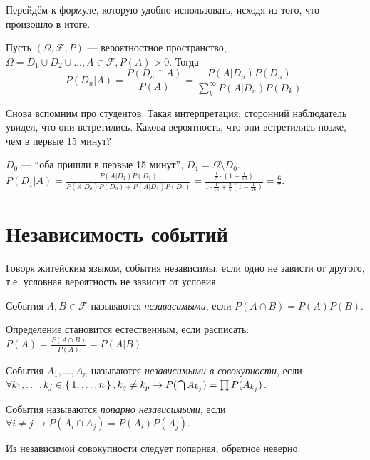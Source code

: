 Перейдём к формуле, которую удобно использовать, исходя из того, что произошло в итоге.

\begin{claim}
  Пусть $(\Omega, \mathcal{F}, P)$ --- вероятностное пространство, $\Omega = D_1 \cup D_2 \cup \ldots, A \in \mathcal{F}, P(A) > 0$. Тогда
  \[
	P(D_n|A) = \frac{P(D_n \cap A)}{P(A)} = \frac{P(A|D_n)P(D_n)}{\sum_k^{\infty} P(A|D_n)P(D_k)}.
  \]
\end{claim}

\begin{example}
  Снова вспомним про студентов. Такая интерпретация: сторонний наблюдатель увидел, что они встретились.
  Какова вероятность, что они встретились позже, чем в первые 15 минут?
  
  $D_0$ --- ``оба пришли в первые 15 минут'', $D_1 = \Omega \setminus D_0$.
  $P(D_1|A) = \frac{P(A|D_1)P(D_1)}{P(A|D_0)P(D_0) + P(A|D_1)P(D_1)} = 
  \frac{\frac1{5}\cdot\left(1-\frac1{16}\right)}{1\cdot\frac1{16} + \frac{2}{5}\left(1-\frac{1}{16}\right)} = \frac{6}{7}$.
\end{example}

\section{Независимость событий}

Говоря житейским языком, события независимы, если одно не зависти от другого, т.е. условная вероятность не зависит от условия.

\begin{define*}
  События $A, B \in \mathcal{F} $ называются \emph{независимыми}, если $P(A\cap B) = P(A)P(B)$.
\end{define*}

\begin{remark*}
  Определение становится естественным, если расписать:
  $P(A) = \frac{P(A\cap B)}{P(A)} = P(A|B)$
\end{remark*}

\begin{define*}
  События $A_1, \ldots, A_n$ называются \emph{независимыми в совокупности}, если $\forall k_1,\ldots,k_j \in \set{1,\ldots,n}, k_q \neq k_p \to 
  P(\bigcap A_{k_j}) = \prod P(A_{k_j})$.

  События называются \emph{попарно независимыми}, если $\forall i \neq j \to P(A_i\cap A_j) = P(A_i)P(A_j)$.
\end{define*}

\begin{remark*}
  Из независимой совокупности следует попарная, обратное неверно.
\end{remark*}

